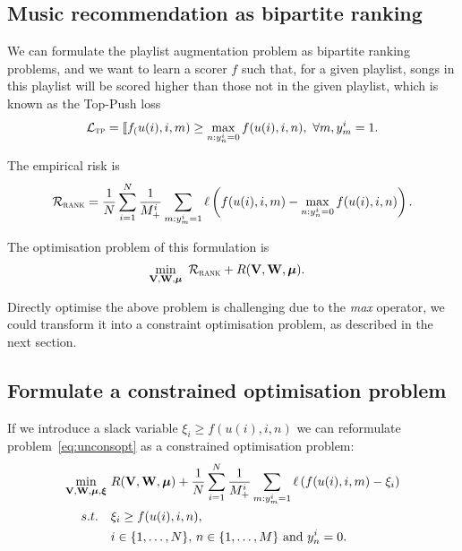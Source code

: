 \subsection{Music recommendation as bipartite ranking}

We can formulate the playlist augmentation problem as bipartite ranking problems, 
and we want to learn a scorer $f$ such that, for a given playlist, 
songs in this playlist will be scored higher than those not in the given playlist,
which is known as the Top-Push loss~\cite{li2014top}
\begin{equation*}
\mathcal{L}_\textsc{tp} = \llbracket f_(u(i), i, m) \ge \max_{n: y_n^i=0} f(u(i), i, n), \ \forall m, y_m^i = 1.
\end{equation*}

The empirical risk is
$$
\mathcal{R}_\textsc{rank} 
= \frac{1}{N} \sum_{i=1}^N \frac{1}{M_+^i} \sum_{m: y_m^i = 1} \ell \left( f(u(i), i, m) - \max_{n: y_n^i = 0} f(u(i), i, n) \right).
$$

The optimisation problem of this formulation is
\begin{equation}
\label{eq:unconsopt}
\begin{aligned}
&\min_{\mathbf{V}, \mathbf{W}, \bm{\mu}} \ \mathcal{R}_\textsc{rank} + R(\mathbf{V}, \mathbf{W}, \bm{\mu}).
\end{aligned}
\end{equation}

Directly optimise the above problem is challenging due to the \emph{max} operator,
we could transform it into a constraint optimisation problem, as described in the next section.


\subsection{Formulate a constrained optimisation problem}
If we introduce a slack variable $\xi_i \ge f(u(i), i, n)$
we can reformulate problem~\ref{eq:unconsopt} as a constrained optimisation problem:
\begin{equation}
\label{eq:cvxopt}
\begin{aligned}
\min_{\mathbf{V}, \mathbf{W}, \bm{\mu}, \bm{\xi}} \ & R(\mathbf{V}, \mathbf{W}, \bm{\mu})
  + \frac{1}{N} \sum_{i=1}^N \frac{1}{M_+^i} \sum_{m: y_m^i = 1} \ell \left( f(u(i), i, m) - \xi_i \right) \\
s.t. \quad & 
\xi_i \ge f(u(i), i, n), \\
& i \in \{1,\dots,N\}, \, n \in \{1,\dots,M\} \ \mathrm{and} \ y_n^i = 0.
\end{aligned}
\end{equation}

